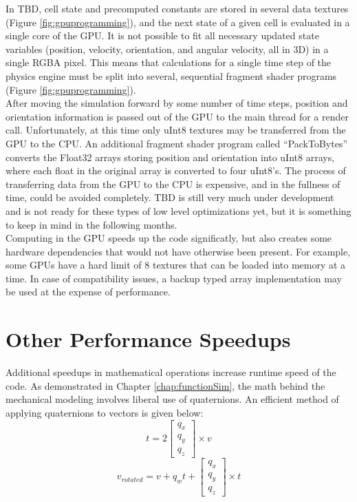 {In TBD, cell state and precomputed constants are stored in several data textures (Figure \ref{fig:gpuprogramming}), and the next state of a given cell is evaluated in a single core of the GPU.  It is not possible to fit all necessary updated state variables (position, velocity, orientation, and angular velocity, all in 3D) in a single RGBA pixel.  This means that calculations for a single time step of the physics engine must be split into several, sequential fragment shader programs (Figure \ref{fig:gpuprogramming}).\\

After moving the simulation forward by some number of time steps, position and orientation information is passed out of the GPU to the main thread for a render call.  Unfortunately, at this time only uInt8 textures may be transferred from the GPU to the CPU.  An additional fragment shader program called ``PackToBytes'' converts the Float32 arrays storing position and orientation into uInt8 arrays, where each float in the original array is converted to four uInt8's.  The process of transferring data from the GPU to the CPU is expensive, and in the fullness of time, could be avoided completely.  TBD is still very much under development and is not ready for these types of low level optimizations yet, but it is something to keep in mind in the following months.\\

Computing in the GPU speeds up the code significatly, but also creates some hardware dependencies that would not have otherwise been present.  For example, some GPUs have a hard limit of 8 textures that can be loaded into memory at a time.  In case of compatibility issues, a backup typed array implementation may be used at the expense of performance.

\section{Other Performance Speedups}

Additional speedups in mathematical operations increase runtime speed of the code.  As demonstrated in Chapter \ref{chap:functionSim}, the math behind the mechanical modeling involves liberal use of quaternions.  An efficient method of applying quaternions to vectors is given below:
\[ t = 2 \left[ \begin{array}{ccc}
q_x\\
q_y\\
q_z
 \end{array} \right] \times v\]
\[ v_{rotated} = v + q_wt +  \left[ \begin{array}{ccc}
q_x\\
q_y\\
q_z
 \end{array} \right] \times t\]
 
}
